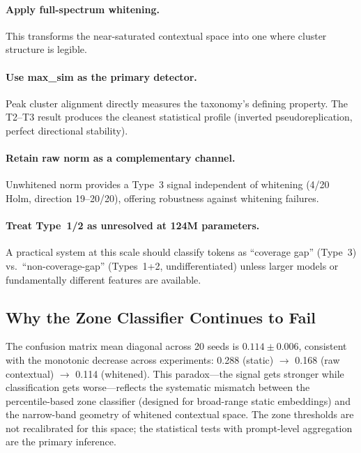\documentclass[11pt]{article}
\begin{document}
\paragraph{Apply full-spectrum whitening.} This transforms the near-saturated contextual space into one where cluster structure is legible.

\paragraph{Use max\_sim as the primary detector.} Peak cluster alignment directly measures the taxonomy's defining property. The T2--T3 result produces the cleanest statistical profile (inverted pseudoreplication, perfect directional stability).

\paragraph{Retain raw norm as a complementary channel.} Unwhitened norm provides a Type~3 signal independent of whitening (4/20 Holm, direction 19--20/20), offering robustness against whitening failures.

\paragraph{Treat Type~1/2 as unresolved at 124M parameters.} A practical system at this scale should classify tokens as ``coverage gap'' (Type~3) vs.\ ``non-coverage-gap'' (Types~1+2, undifferentiated) unless larger models or fundamentally different features are available.

\subsection{Why the Zone Classifier Continues to Fail}

The confusion matrix mean diagonal across 20 seeds is $0.114 \pm 0.006$, consistent with the monotonic decrease across experiments: 0.288 (static) $\to$ 0.168 (raw contextual) $\to$ 0.114 (whitened). This paradox---the signal gets stronger while classification gets worse---reflects the systematic mismatch between the percentile-based zone classifier (designed for broad-range static embeddings) and the narrow-band geometry of whitened contextual space. The zone thresholds are not recalibrated for this space; the statistical tests with prompt-level aggregation are the primary inference.

\end{document}
